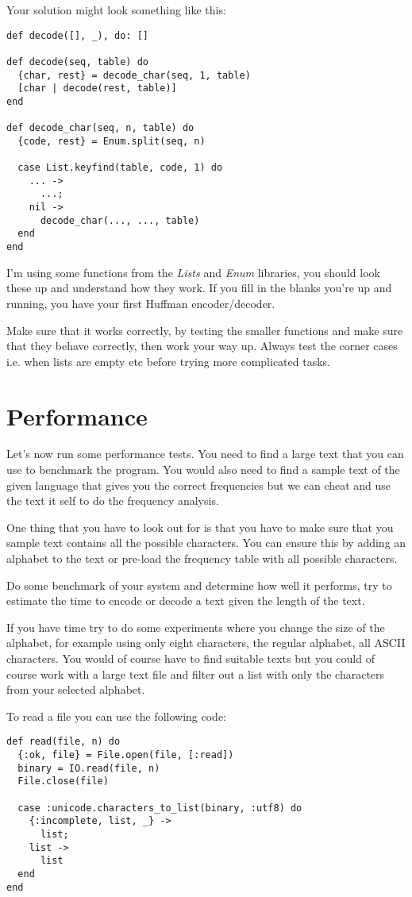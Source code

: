 \documentclass[a4paper,11pt]{article}
\begin{document}
Your solution might look something like this:

\begin{verbatim}
def decode([], _), do: []

def decode(seq, table) do
  {char, rest} = decode_char(seq, 1, table)
  [char | decode(rest, table)]
end

def decode_char(seq, n, table) do
  {code, rest} = Enum.split(seq, n)

  case List.keyfind(table, code, 1) do
    ... ->
      ...;
    nil ->
      decode_char(..., ..., table)
  end
end
\end{verbatim}

I'm using some functions from the {\em Lists} and {\em Enum} libraries, you should look
these up and understand how they work. If you fill in the blanks
you're up and running, you have your first Huffman encoder/decoder.

Make sure that it works correctly, by testing the smaller functions
and make sure that they behave correctly, then work your way
up. Always test the corner cases i.e. when lists are empty etc before
trying more complicated tasks.



\section{Performance}

Let's now run some performance tests. You need to find a large text
that you can use to benchmark the program. You would also need to find
a sample text of the given language that gives you the correct
frequencies but we can cheat and use the text it self to do the
frequency analysis. 

One thing that you have to look out for is that you have to make sure
that you sample text contains all the possible characters. You can
ensure this by adding an alphabet to the text or pre-load the
frequency table with all possible characters.

Do some benchmark of your system and determine how well it
performs, try to estimate the time to encode or decode a text given
the length of the text. 

If you have time try to do some experiments where you change the size
of the alphabet, for example using only eight characters, the regular
alphabet, all ASCII characters. You would of course have to find
suitable texts but you could of course work with a large text file and
filter out a list with only the characters from your selected alphabet.


To read a file you can use the following code:

\begin{verbatim}
def read(file, n) do
  {:ok, file} = File.open(file, [:read])
  binary = IO.read(file, n)
  File.close(file)
  
  case :unicode.characters_to_list(binary, :utf8) do
    {:incomplete, list, _} ->
      list;
    list ->
      list
  end
end
\end{verbatim}
\end{document}
